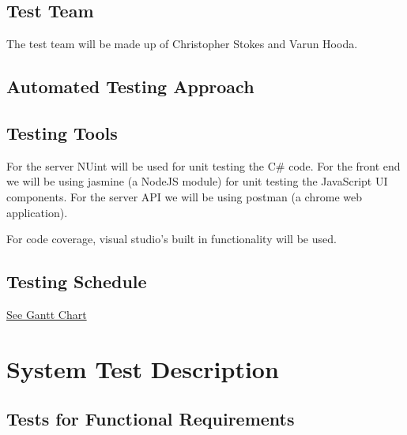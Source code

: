 \documentclass[12pt, titlepage]{article}
\begin{document}
    \subsection{Test Team}
    The test team will be made up of Christopher Stokes and Varun Hooda.

    \subsection{Automated Testing Approach}

    \subsection{Testing Tools}
    For the server NUint will be used for unit testing the C\# code.
    For the front end we will be using jasmine (a NodeJS module) for unit testing
    the JavaScript UI components.
    For the server API we will be using postman (a chrome web application).

    For code coverage, visual studio's built in functionality will be used.

    \subsection{Testing Schedule}
        
    \href{../../ProjectSchedule/schedule.png}{See Gantt Chart}

\section{System Test Description}
	
\subsection{Tests for Functional Requirements}
\end{document}
